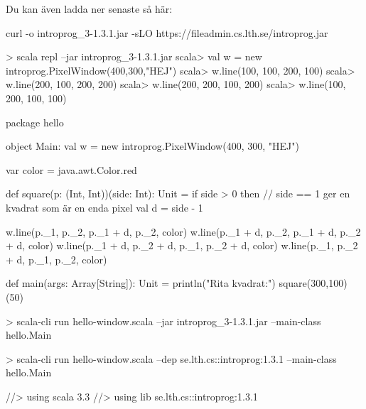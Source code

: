 \SubtaskSolved 
Du kan även ladda ner senaste  så här:
\begin{REPLnonum}
curl -o introprog_3-1.3.1.jar -sLO https://fileadmin.cs.lth.se/introprog.jar 
\end{REPLnonum}


\SubtaskSolved
\begin{REPL}
> scala repl --jar introprog_3-1.3.1.jar
scala> val w = new introprog.PixelWindow(400,300,"HEJ")
scala> w.line(100, 100, 200, 100)
scala> w.line(200, 100, 200, 200)
scala> w.line(200, 200, 100, 200)
scala> w.line(100, 200, 100, 100)
\end{REPL}

\SubtaskSolved
\begin{Code}
package hello

object Main:
  val w = new introprog.PixelWindow(400, 300, "HEJ")

  var color = java.awt.Color.red

  def square(p: (Int, Int))(side: Int): Unit =
    if side > 0 then
      // side == 1 ger en kvadrat som är en enda pixel
      val d = side - 1  
      
      w.line(p._1,     p._2,     p._1 + d, p._2,     color)
      w.line(p._1 + d, p._2,     p._1 + d, p._2 + d, color)
      w.line(p._1 + d, p._2 + d, p._1,     p._2 + d, color)
      w.line(p._1,     p._2 + d, p._1,     p._2,     color)

  def main(args: Array[String]): Unit =
    println("Rita kvadrat:")
    square(300,100)(50)

\end{Code}

\SubtaskSolved 
\begin{REPLnonum}
> scala-cli run hello-window.scala --jar introprog_3-1.3.1.jar --main-class hello.Main
\end{REPLnonum}

\SubtaskSolved 
\begin{REPLnonum}
> scala-cli run hello-window.scala --dep se.lth.cs::introprog:1.3.1 --main-class hello.Main
\end{REPLnonum}


\SubtaskSolved 
\begin{Code}
//> using scala 3.3
//> using lib se.lth.cs::introprog:1.3.1
\end{Code}
\QUESTEND




\QUESTBEGIN

